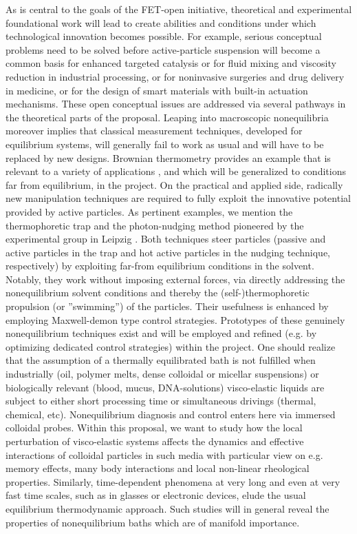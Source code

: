  As is central to the goals
of the FET-open initiative, theoretical and experimental foundational work will lead to
create abilities and conditions under which technological innovation becomes possible.  For
example, serious conceptual problems need to be solved before active-particle suspension
will become a common basis for enhanced targeted catalysis or for fluid mixing and viscosity
reduction in industrial processing, or for noninvasive surgeries and drug delivery in
medicine, or for the design of smart materials with built-in actuation mechanisms. These
open conceptual issues are addressed via several pathways in the theoretical parts of the
proposal.  Leaping into macroscopic nonequilibria moreover implies that classical
measurement techniques, developed for equilibrium systems, will generally fail to work as
usual and will have to be replaced by new designs. Brownian thermometry provides an example
that is relevant to a variety of applications \cite{kroy:2014}, and which will be
generalized to conditions far from equilibrium, in the project.  On the practical and
applied side, radically new manipulation techniques are required to fully exploit the
innovative potential provided by active particles. As pertinent examples, we mention the
thermophoretic trap and the photon-nudging method pioneered by the experimental group in
Leipzig \cite{Qian2013,Braun:NanoLetters:2015}.  Both techniques steer particles (passive
and active particles in the trap and hot active particles in the nudging technique,
respectively) by exploiting far-from equilibrium conditions in the solvent. Notably, they
work without imposing external forces, via directly addressing the nonequilibrium solvent
conditions and thereby the (self-)thermophoretic propulsion (or ''swimming'') of the
particles. Their usefulness is enhanced by employing Maxwell-demon type control
strategies. Prototypes of these genuinely nonequilibrium techniques exist and will be
employed and refined (e.g. by optimizing dedicated control strategies) within the project.
%
One should realize that the assumption of a thermally equilibrated bath is not fulfilled
when industrially (oil, polymer melts, dense colloidal or micellar suspensions) or
biologically relevant (blood, mucus, DNA-solutions) visco-elastic liquids are subject to
either short processing time or simultaneous drivings (thermal, chemical,
etc). Nonequilibrium diagnosis and control enters here via immersed colloidal probes.
%
Within this proposal, we
want to study how the local perturbation of visco-elastic systems affects the dynamics and
effective interactions of colloidal particles in such media with particular view on
e.g. memory effects, many body interactions and local non-linear rheological properties.
Similarly, time-dependent phenomena at very long and even at very fast time scales, such as
in glasses or electronic devices, elude the usual equilibrium thermodynamic
approach.  Such studies will in general reveal the properties of nonequilibrium baths which
are of manifold importance.

